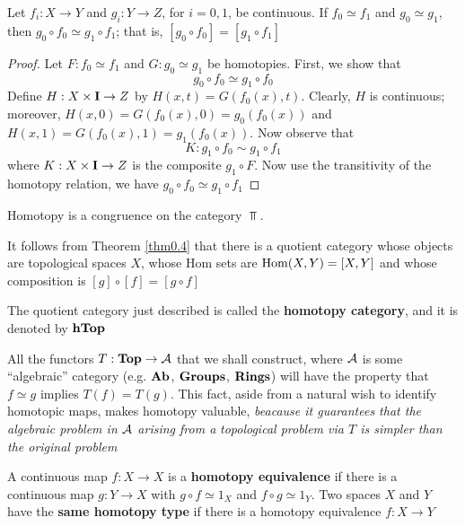 \documentclass[11pt]{article}
\begin{document}
\begin{theorem}[]
Let \(f_i:X\to Y\) and \(g_i:Y\to Z\), for \(i=0,1\), be continuous. If \(f_0\simeq f_1\) and \(g_0\simeq g_1\),
then \(g_0\circ f_0\simeq g_1\circ f_1\); that is, \([g_0\circ f_0]=[g_1\circ f_1]\)
\end{theorem}

\begin{proof}
Let \(F:f_0\simeq f_1\) and \(G:g_0\simeq g_1\) be homotopies. First, we show that
\begin{equation*}
g_0\circ f_0\simeq g_1\circ f_0
\end{equation*}
Define \(H:X\times\operatorname{\textbf{I}}\to Z\) by \(H(x,t)=G(f_0(x),t)\). Clearly, \(H\) is continuous;
moreover, \(H(x,0)=G(f_0(x),0)=g_0(f_0(x))\) and \(H(x,1)=G(f_0(x),1)=g_1(f_0(x))\). Now observe
that
\begin{equation*}
K:g_1\circ f_0\sim g_1\circ f_1
\end{equation*}
where \(K:X\times\operatorname{\textbf{I}}\to Z\) is the composite \(g_1\circ F\). Now use the transitivity of the homotopy relation,
we have \(g_0\circ f_0\simeq g_1\circ f_1\)
\end{proof}

\begin{corollary}[]
Homotopy is a congruence on the category \(\Top\).
\end{corollary}

It follows from Theorem \ref{thm0.4} that there is a quotient category whose objects are
topological spaces \(X\), whose Hom sets are \(\operatorname{Hom}(X,Y)=[X,Y]\) and whose composition
is \([g]\circ[f]=[g\circ f]\)

\begin{definition}[]
The quotient category just described is called the \textbf{homotopy category}, and it is denoted by
\(\operatorname{\textbf{hTop}}\)
\end{definition}

All the functors \(T:\operatorname{\textbf{Top}}\to\mathcal{A}\) that we shall construct, where \(\mathcal{A}\) is some ``algebraic'' category
(e.g. \(\operatorname{\textbf{Ab}}\), \(\operatorname{\textbf{Groups}}\), \(\operatorname{\textbf{Rings}}\)) will have the property that \(f\simeq g\)
implies \(T(f)=T(g)\). This fact, aside from a natural wish to identify homotopic maps, makes
homotopy valuable, \emph{beacause it guarantees that the algebraic problem in \(\mathcal{A}\) arising from a}
\emph{topological problem via \(T\) is simpler than the original problem}

\begin{definition}[]
A continuous map \(f:X\to X\) is a \textbf{homotopy equivalence} if there is a continuous map \(g:Y\to X\)
with \(g\circ f\simeq 1_X\) and \(f\circ g\simeq 1_Y\). Two spaces \(X\) and \(Y\) have the \textbf{same homotopy type} if
there is a homotopy equivalence \(f:X\to Y\)
\end{definition}
\end{document}
